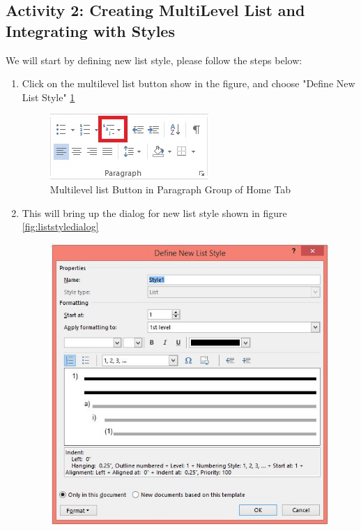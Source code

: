  \subsection{Activity 2: Creating MultiLevel List and Integrating with Styles}
 We will start by defining new list style, please follow the steps below:
 \begin{enumerate}
    \item Click on the multilevel list button show in the figure, and choose "Define New List Style" \ref{fig:multilevellist}
    \begin{figure}
        \centering
        \includegraphics{./Figures/multilevellist.jpg}
        \caption{Multilevel list Button in Paragraph Group of Home Tab}
        \label{fig:multilevellist}
    \end{figure}
    \item This will bring up the dialog for new list style shown in figure \ref{fig:liststyledialog}
    \begin{figure}
    \centering
    \includegraphics[width=\textwidth]{./Figures/liststyledialog.jpg}

\end{figure}
\end{enumerate}
